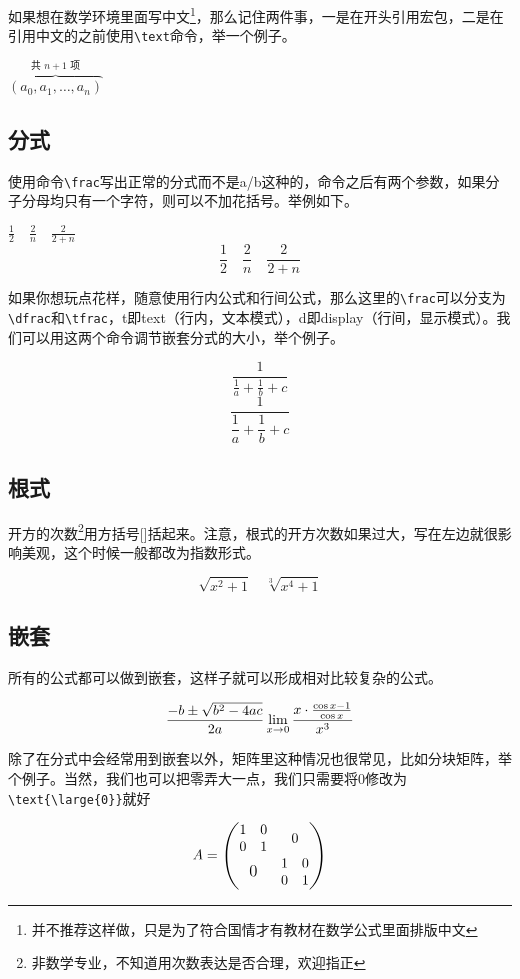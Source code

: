 如果想在数学环境里面写中文\footnote{并不推荐这样做，只是为了符合国情才有教材在数学公式里面排版中文}，那么记住两件事，一是在开头引用\CTeX 宏包，二是在引用中文的之前使用\lstinline|\text|命令，举一个例子。
\begin{codeshow}
$\overbrace{(a_0,a_1,\dots,a_n)}
^{\text{共 $n+1$ 项}}$
\end{codeshow}

\subsection{分式}
使用命令\lstinline|\frac|写出正常的分式而不是a/b这种的，命令之后有两个参数，如果分子分母均只有一个字符，则可以不加花括号。举例如下。
\begin{codeshow}
$\frac12 \quad \frac2n
\quad \frac{2}{2+n}$
\[ \frac12 \quad \frac2n
\quad \frac{2}{2+n} \]
\end{codeshow}

如果你想玩点花样，随意使用行内公式和行间公式，那么这里的\lstinline|\frac|可以分支为\lstinline|\dfrac|和\lstinline|\tfrac|，t即text（行内，文本模式），d即display（行间，显示模式）。我们可以用这两个命令调节嵌套分式的大小，举个例子。
\begin{codeshow}
\[ \frac{1}{\tfrac1a+\tfrac1b+c} \]
\[ \frac{1}{\dfrac1a+\dfrac1b+c} \]
\end{codeshow}

\subsection{根式}
开方的次数\footnote{非数学专业，不知道用次数表达是否合理，欢迎指正}用方括号[]括起来。注意，根式的开方次数如果过大，写在左边就很影响美观，这个时候一般都改为指数形式。
\begin{codeshow}
\[
\sqrt{x^2+1}\quad \sqrt[3]{x^4+1}
\]
\end{codeshow}

\subsection{嵌套}
所有的公式都可以做到嵌套，这样子就可以形成相对比较复杂的公式。
\begin{codeshow}
\[
\frac{-b\pm \sqrt{b^{2}-4ac}}{2a}\\
\lim\limits_{x\to 0}\frac
{x\cdot \frac{\cos x -1}{\cos x}}{x^{3}}
\]
\end{codeshow}

除了在分式中会经常用到嵌套以外，矩阵里这种情况也很常见，比如分块矩阵，举个例子。当然，我们也可以把零弄大一点，我们只需要将0修改为\lstinline|\text{\large{0}}|就好
\begin{codeshow}
\[
A=\begin{pmatrix}
\begin{matrix}
1 & 0 \\
0 & 1
\end{matrix} & 0 \\
\text{\large{0}} & \begin{matrix}
1 & 0 \\
0 & 1
\end{matrix}
\end{pmatrix}
\]
\end{codeshow}

